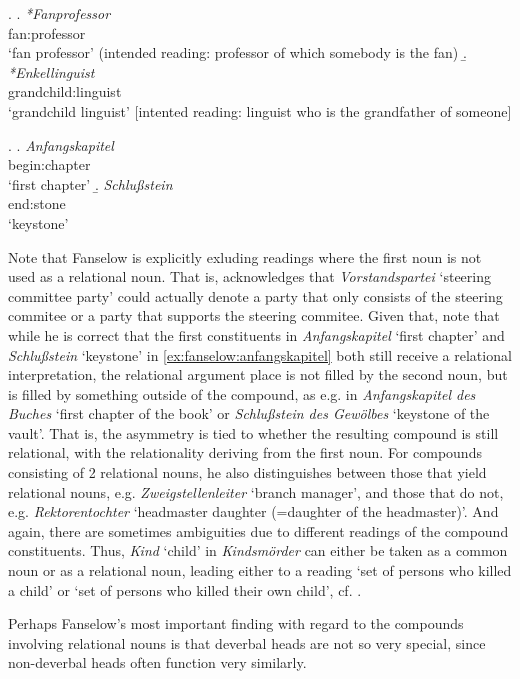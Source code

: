 \ex. \a. \gll
\emph{*Fanprofessor}\\
fan:professor\\
`fan professor' (intended
reading: professor of which somebody is the fan)
\b. \gll
\emph{*Enkellinguist}\\
grandchild:linguist\\
`grandchild linguist' [intented reading: linguist
who is the grandfather of someone]

\ex. \label{ex:fanselow:anfangskapitel} \a. \gll
\emph{Anfangskapitel}\\
begin:chapter\\
`first chapter'
\b. \gll
\emph{Schlußstein}\\
end:stone\\
`keystone'

Note that
Fanselow is explicitly exluding readings where the first noun is not
used as a relational noun. That is, \citet[107]{Fanselow:1981} acknowledges that
\emph{Vorstandspartei} %
`steering
committee party' could actually denote a party that only consists of
the steering commitee or a party that supports the steering
commitee. Given that, note that while he is correct that the
first constituents in \emph{Anfangskapitel} `first chapter' and
\emph{Schlußstein} `keystone' in \ref{ex:fanselow:anfangskapitel} both still receive a relational interpretation,
the relational argument place is not filled by the second noun, but is
filled by something outside of the compound, as e.g. in
\emph{Anfangskapitel des Buches} `first chapter of the book' or \emph{Schlußstein des
  Gewölbes} `keystone of the vault'. That is, the asymmetry is tied to whether the resulting
compound is still relational, with the relationality deriving from the
first noun. For compounds consisting
of 2 relational nouns, he also distinguishes between those that yield
relational nouns, e.g. \emph{Zweigstellenleiter} `branch manager', and those that do not,
e.g. \emph{Rektorentochter}  `headmaster daughter (=daughter of the
headmaster)'. And again, there are sometimes ambiguities due to   
different readings of the compound constituents. Thus, \emph{Kind} `child' in
\emph{Kindsmörder} can either be taken as a common noun or as a relational
noun, leading either to a reading `set of persons who killed a child' or
`set of persons who killed their own child', cf. \citet[114]{Fanselow:1981}.

Perhaps Fanselow's most important finding with regard to the compounds involving
relational nouns is that deverbal heads are not so very
special, since
non-deverbal heads often function very similarly.

